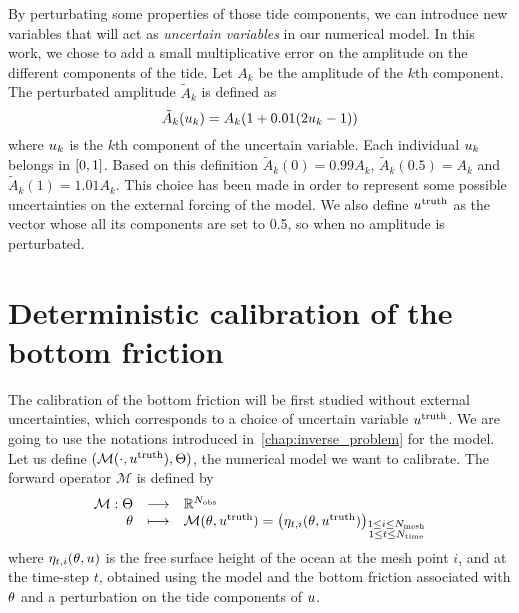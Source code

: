 \documentclass[../../Main_ManuscritThese.tex]{subfiles}
\begin{document}
By perturbating some properties of those tide components, we can
introduce new variables that will act as \emph{uncertain variables} in
our numerical model.  In this work, we chose to add a small
multiplicative error on the amplitude on the different components of
the tide. Let $A_k$ be the amplitude of the $k$th component. The
perturbated amplitude $\tilde{A}_k$ is defined as
\begin{equation}
  \label{eq:tide_error}
  \tilde{A}_k(u_k) = A_k (1 + 0.01(2u_k - 1))
\end{equation}
where $u_k$ is the $k$th component of the uncertain variable. Each
individual $u_k$ belongs in $\interval{0}{1}$. Based on this
definition $\tilde{A}_k(0) = 0.99A_k$, $\tilde{A}_k(0.5) = A_k$ and
$\tilde{A}_k(1) = 1.01A_k$. This choice has been made in order to
represent some possible uncertainties on the external forcing of the
model. We also define $u^{\mathrm{truth}}$ as the vector whose all
its components are set to \num{0.5}, so when no amplitude is
perturbated.

\section{Deterministic calibration of the bottom friction}
\label{sec:deterministic_calibration_bott}
The calibration of the bottom friction will be first studied without
external uncertainties, which corresponds to a choice of uncertain
variable $u^{\mathrm{truth}}$.
We are going to use the notations introduced
in~\cref{chap:inverse_problem} for the model. Let us define
$(\mathcal{M}(\cdot,u^{\mathrm{truth}}),\Theta)$, the numerical
model we want to calibrate. The forward operator $\mathcal{M}$ is
defined by
\begin{equation}
  \begin{array}{rcl}
    \mathcal{M}: \Theta  &\longrightarrow& \mathbb{R}^{N_{\mathrm{obs}}} \\
    \theta & \longmapsto & \mathcal{M}(\theta, u^{\mathrm{truth}}) = \left(\eta_{t,i}(\theta, u^{\mathrm{truth}})\right)_{\substack{1 \leq i \leq N_{\mathrm{mesh}} \\ 1 \leq t \leq N_{\mathrm{time}}}} \\ 
  \end{array}
\end{equation}
where $\eta_{t,i}(\theta,u)$ is the free surface height of the ocean at
the mesh point $i$, and at the time-step $t$, obtained using the model
and the bottom friction associated with $\theta$ and a perturbation on
the tide components of $u$.
\end{document}
